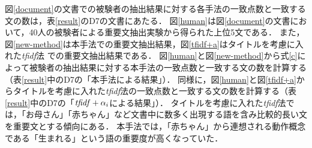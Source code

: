 図\ref{document}の文書での被験者の抽出結果に対する各手法の一致点数と一致する文の数は，表\ref{result}のD7の文書にあたる．
図\ref{human}は図\ref{document}の文書において，40人の被験者による重要文抽出実験から得られた上位5文である．
また，図\ref{new-method}は本手法での重要文抽出結果，図\ref{tfidf+a}はタイトルを考慮に入れた{\it tfidf}法
での重要文抽出結果である．
図\ref{human}と図\ref{new-method}から式\ref{c}によって被験者の抽出結果に対する本手法の一致点数と一致する文の数を計算する（表\ref{result}中のD7の「本手法による結果」）．
同様に，図\ref{human}と図\ref{tfidf+a}からタイトルを考慮に入れた{\it tfidf}法の一致点数と一致する文の数を計算する（表\ref{result}中のD7の「${\it tfidf}+\alpha_{i}$による結果」）．
タイトルを考慮に入れた{\it tfidf}法では，「お母さん」「赤ちゃん」など文書中に数多く出現する語を含み比較的長い文を重要文とする傾向にある．
本手法では，「赤ちゃん」から連想される動作概念である「生まれる」という語の重要度が高くなっていた．



